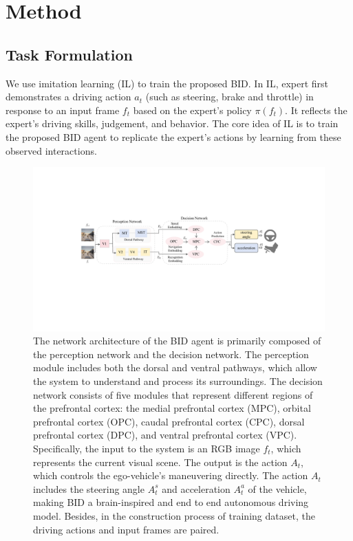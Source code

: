 \section{Method}

\subsection{Task Formulation}

\hspace{1pc}We use imitation learning (IL) to train the proposed BID.
In IL, expert first demonstrates a driving action $a_{t}$ (such as steering, brake and throttle) in response to an input frame $f_t$ based on the expert's policy $\pi(f_{t})$.
It reflects the expert's driving skills, judgement, and behavior.
The core idea of IL is to train the proposed BID agent to replicate the expert's actions by learning from these observed interactions.

\begin{figure}[t]
	\centering
	\includegraphics[width=\linewidth]{fig/net.pdf}
	\caption{The network architecture of the BID agent is primarily composed of the perception network and the decision network.
		The perception module includes both the dorsal and ventral pathways, which allow the system to understand and process its surroundings.
		The decision network consists of five modules that represent different regions of the prefrontal cortex: the medial prefrontal cortex (MPC), orbital prefrontal cortex (OPC), caudal prefrontal cortex (CPC), dorsal prefrontal cortex (DPC), and ventral prefrontal cortex (VPC). 
		Specifically, the input to the system is an RGB image $f_{t} $, which represents the current visual scene.
		The output is the action $A_t$, which controls the ego-vehicle's maneuvering directly.
		The action $A_t$ includes the steering angle $ A_t^s $ and acceleration $ A_t^a $ of the vehicle, making BID a brain-inspired and end to end autonomous driving model.
		Besides, in the construction process of training dataset, the driving actions and input frames are paired.
	}
	\label{fig:fig2}
\end{figure}

